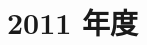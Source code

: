 \documentclass[../../hsm_tok_a.tex]{subfiles}
\begin{document}
    \section{2011 年度}

    

    \clearpage

    
\end{document}

